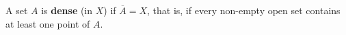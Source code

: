 A set $A$ is \textbf{dense} (in $X$) if $\overline{A} = X$, that is, if every non-empty open set contains at least one point of $A$.
